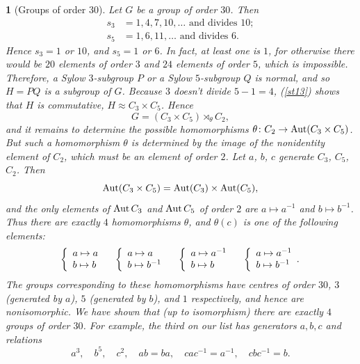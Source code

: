 \documentclass[a4paper,11pt,final,openany]{memoir}%
\newtheorem{plain}[X]{}
\theoremstyle{nonumberplain}
\begin{document}
\begin{plain}
[Groups of order 30]\label{st17}%
%
Let $G$ be a group of order $30$. Then
\begin{align*}
s_{3}  &  =1,4,7,10,\ldots\text{ and divides }10;\\
s_{5}  &  =1,6,11,\ldots\text{ and divides $6$}.
\end{align*}
Hence $s_{3}=1$ or $10$, and $s_{5}=1$ or $6$. In fact, at least one is $1$,
for otherwise there would be $20$ elements of order $3$ and $24$ elements of
order $5$, which is impossible. Therefore, a Sylow $3$-subgroup $P$ or a Sylow
$5$-subgroup $Q$ is normal, and so $H=PQ$ is a subgroup of $G$. Because $3$
doesn't divide $5-1=4$, (\ref{st13}) shows that $H$ is commutative, $H\approx
C_{3}\times C_{5}$. Hence
\[
G=(C_{3}\times C_{5})\rtimes_{\theta}C_{2},
\]
and it remains to determine the possible homomorphisms $\theta\colon
C_{2}\rightarrow\operatorname{Aut}(C_{3}\times C_{5})$. But such a homomorphism $\theta$ is
determined by the image of the nonidentity element of $C_{2}$, which must be
an element of order $2$. Let $a$, $b$, $c$ generate $C_{3}$, $C_{5}$, $C_{2}$.
Then
\[
\operatorname{Aut}(C_{3}\times C_{5})=\operatorname{Aut}(C_{3})\times\operatorname{Aut}(C_{5}),
\]
and the only elements of $\operatorname{Aut} C_{3}$ and $\operatorname{Aut} C_{5}$ of order $2$ are
$a\mapsto a^{-1}$ and $b\mapsto b^{-1}$. Thus there are exactly $4$
homomorphisms $\theta$, and $\theta(c)$ is one of the following elements:
\[
\left\{
\begin{array}
[c]{l}%
a\mapsto a\\
b\mapsto b
\end{array}
\quad\right.  \left\{
\begin{array}
[c]{l}%
a\mapsto a\\
b\mapsto b^{-1}%
\end{array}
\quad\right.  \left\{
\begin{array}
[c]{l}%
a\mapsto a^{-1}\\
b\mapsto b
\end{array}
\quad\right.  \left\{
\begin{array}
[c]{l}%
a\mapsto a^{-1}\\
b\mapsto b^{-1}%
\end{array}
.\right.
\]
The groups corresponding to these homomorphisms have centres of order $30$,
$3$ (generated by $a$), $5$ (generated by $b$), and $1$ respectively, and
hence are nonisomorphic. We have shown that (up to isomorphism) there are
exactly $4$ groups of order $30$. For example, the third on our list has
generators $a,b,c$ and relations
\[
a^{3},\quad b^{5},\quad c^{2},\quad ab=ba,\quad cac^{-1}=a^{-1},\quad
cbc^{-1}=b.
\]

\end{plain}
\end{document}
